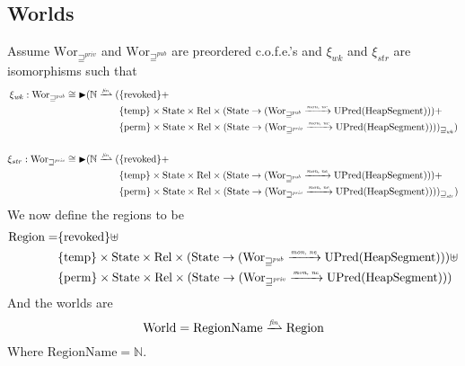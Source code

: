 \documentclass[a4paper]{article}
\newcommand{\finparfun}{\xrightharpoonup{\textit{\tiny{fin}}}}
\newcommand{\monnefun}{\xrightarrow{\textit{\tiny{mon, ne}}}}
\newcommand{\fun}{\rightarrow}
\newcommand{\blater}{\mathop{\blacktriangleright}}
\newcommand{\cofe}{c.o.f.e.}
\newcommand{\cofes}{\cofe{}'s}
\newcommand{\var}[1]{\mathit{#1}}
\newcommand{\future}{\mathbin{\sqsupseteq}}
\newcommand{\futurewk}{\mathbin{\sqsupseteq}^{\var{pub}}}
\newcommand{\futurestr}{\mathbin{\sqsupseteq}^{\var{priv}}}
\newcommand{\plaindom}[1]{\mathrm{#1}}
\newcommand{\HeapSegments}{\plaindom{HeapSegment}}
\newcommand{\nats}{\mathbb{N}}
\newcommand{\Rel}{\plaindom{Rel}}
\newcommand{\States}{\plaindom{State}}
\newcommand{\RegionNames}{\plaindom{RegionName}}
\newcommand{\Regions}{\plaindom{Region}}
\newcommand{\Worlds}{\plaindom{World}}
\newcommand{\Wor}{\plaindom{Wor}}
\newcommand{\Worwk}{\Wor_{\futurewk}}
\newcommand{\Worstr}{\Wor_{\futurestr}}
\newcommand{\UPred}[1]{\plaindom{UPred}(#1)}
\newcommand{\plainview}[1]{\mathrm{#1}}
\newcommand{\perma}{\plainview{perm}}
\newcommand{\temp}{\plainview{temp}}
\newcommand{\revoked}{\plainview{revoked}}
\begin{document}
\subsection{Worlds}
Assume $\Worstr$ and $\Worwk$ are preordered \cofes{} and $\xi_{\var{wk}}$ and $\xi_{\var{str}}$ are isomorphisms such that
\begin{align*}
  \xi_{\var{wk}} :   \Worwk \cong \blater (\nats \finparfun (   & \{\revoked\} + \\
                                                                & \{\temp\} \times \States \times \Rel \times (\States \fun (\Worwk \monnefun \UPred{\HeapSegments})) + \\
                                                                & \{\perma\} \times \States \times \Rel \times (\States \fun (\Worstr \monnefun \UPred{\HeapSegments})))_{\future_{\var{wk}}}) \\ \\
  \xi_{\var{str}} :   \Worstr \cong \blater (\nats \finparfun ( & \{\revoked\} + \\
                                                                & \{\temp\} \times \States \times \Rel \times (\States \fun (\Worwk \monnefun \UPred{\HeapSegments})) + \\
                                                                & \{\perma\} \times \States \times \Rel \times (\States \fun (\Worstr \monnefun \UPred{\HeapSegments})))_{\future_{\var{str}}})
\end{align*}
We now define the regions to be
\begin{align*}
  \Regions = & \{\revoked\} \uplus \\
             & \{\temp\} \times \States \times \Rel \times (\States \fun (\Worwk \monnefun \UPred{\HeapSegments})) \uplus \\
             & \{\perma\} \times \States \times \Rel \times (\States \fun (\Worstr \monnefun \UPred{\HeapSegments}))
\end{align*}
And the worlds are
\[
  \Worlds = \RegionNames \finparfun \Regions
\]
Where $\RegionNames = \nats$.
\end{document}
